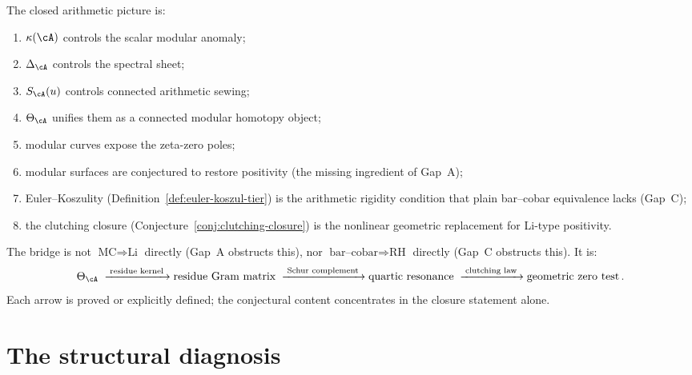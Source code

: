\begin{remark}%
\label{rem:arithmetic-end-state}%
%
The closed arithmetic picture is:
\begin{enumerate}[label=\textup{(\roman*)}]
\item
$\kappa(\cA)$ controls the scalar modular anomaly;
\item
$\Delta_\cA$ controls the spectral sheet;
\item
$S_\cA(u)$ controls connected arithmetic sewing;
\item
$\Theta_\cA$ unifies them as a connected modular homotopy
object;
\item
modular curves expose the zeta-zero poles;
\item
modular surfaces are conjectured to restore positivity
\textup{(}the missing ingredient of Gap~A\textup{)};
\item
Euler--Koszulity
(Definition~\ref{def:euler-koszul-tier})
is the arithmetic rigidity condition that plain bar--cobar
equivalence lacks \textup{(}Gap~C\textup{)};
\item
the clutching closure
(Conjecture~\ref{conj:clutching-closure})
is the nonlinear geometric replacement for Li-type
positivity.
\end{enumerate}
The bridge is not
$\text{MC} \Rightarrow \text{Li}$ directly
\textup{(}Gap~A obstructs this\textup{)},
nor
$\text{bar--cobar} \Rightarrow \text{RH}$ directly
\textup{(}Gap~C obstructs this\textup{)}.
It is:
\[
\Theta_\cA
\;\xrightarrow{\;\text{residue kernel}\;}
\text{residue Gram matrix}
\;\xrightarrow{\;\text{Schur complement}\;}
\text{quartic resonance}
\;\xrightarrow{\;\text{clutching law}\;}
\text{geometric zero test}\,.
\]
Each arrow is proved or explicitly
defined\textup;
the conjectural content concentrates in the
closure statement alone.
\end{remark}

\section{The structural diagnosis}%
\label{sec:modular-rigidity}%
\label{sec:modularity-constraint-rho}%

